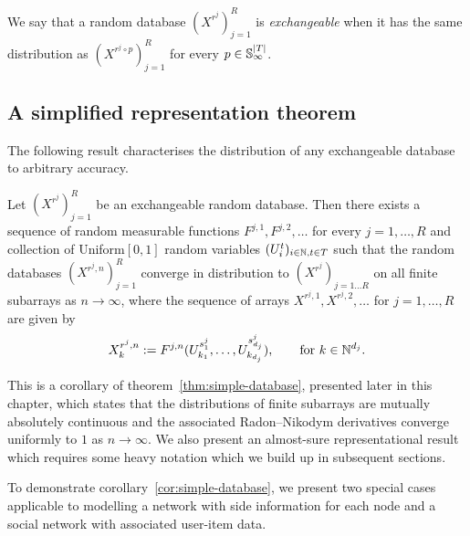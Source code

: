 \begin{definition}
\label{def:arrays:exdatabase}
We say that a random database $(X^{r^j})_{j=1}^R$ is \emph{exchangeable} when it has the same distribution as $(X^{r^j\circ p})_{j=1}^R$ for every $p \in \mathbb{S}_{\infty}^{|T|}$.
\end{definition}



\subsection{A simplified representation theorem}

The following result characterises the distribution of any exchangeable database to arbitrary accuracy.

\begin{cor}
  \label{cor:simple-database}
   Let $(X^{r^j})_{j=1}^R$ be an exchangeable random database.
   Then there exists a sequence of random measurable functions $F^{j,1}, F^{j,2}, \dotsc$ for 
   every $j=1,\ldots, R$ and collection of \iid Uniform$[0,1]$ random variables $(U^t_i)_{i\in\mathbb{N},t \in T}$ such that 
   the random databases $(X^{r^j,n})_{j=1}^R$
    converge in distribution to $(X^{r^j})_{j=1\ldots R}$ on all finite subarrays as $n\to \infty$, where   
   the sequence of arrays $X^{r^j,1},X^{r^j,2},\dotsc$ for $j = 1,\dotsc,R$ are given by
   \[
     X^{r^j,n}_{k} := F^{j,n}(U^{s^j_1}_{k_1},\dotsc,U^{s^j_{d_j}}_{k_{d_j}}), \qquad \text{for } k \in \mathbb{N}^{d_j}.
   \]
\end{cor}

This is a corollary of theorem~\ref{thm:simple-database}, presented later in this chapter, which states that the distributions of finite subarrays are mutually absolutely continuous and the associated Radon--Nikodym derivatives converge uniformly to $1$ as $n \to \infty$.
We also present an almost-sure representational result which requires some heavy notation which we build up in subsequent sections.

To demonstrate corollary~\ref{cor:simple-database}, we present two special cases applicable to modelling a network with side information for each node and a social network with associated user-item data.

